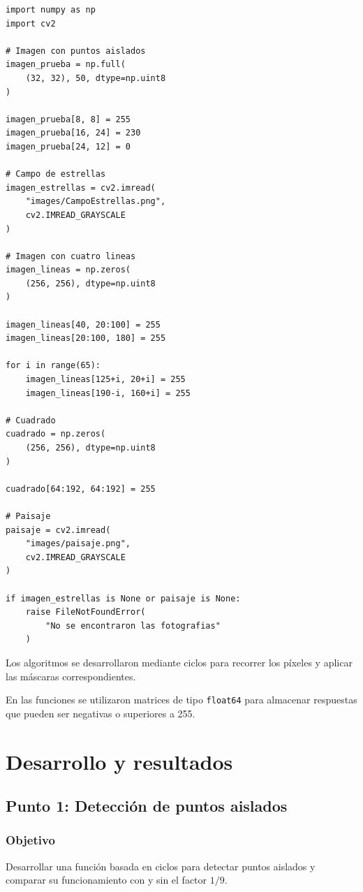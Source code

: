 \documentclass[11pt,letterpaper]{article}
\begin{document}
\begin{lstlisting}
import numpy as np
import cv2

# Imagen con puntos aislados
imagen_prueba = np.full(
    (32, 32), 50, dtype=np.uint8
)

imagen_prueba[8, 8] = 255
imagen_prueba[16, 24] = 230
imagen_prueba[24, 12] = 0

# Campo de estrellas
imagen_estrellas = cv2.imread(
    "images/CampoEstrellas.png",
    cv2.IMREAD_GRAYSCALE
)

# Imagen con cuatro lineas
imagen_lineas = np.zeros(
    (256, 256), dtype=np.uint8
)

imagen_lineas[40, 20:100] = 255
imagen_lineas[20:100, 180] = 255

for i in range(65):
    imagen_lineas[125+i, 20+i] = 255
    imagen_lineas[190-i, 160+i] = 255

# Cuadrado
cuadrado = np.zeros(
    (256, 256), dtype=np.uint8
)

cuadrado[64:192, 64:192] = 255

# Paisaje
paisaje = cv2.imread(
    "images/paisaje.png",
    cv2.IMREAD_GRAYSCALE
)

if imagen_estrellas is None or paisaje is None:
    raise FileNotFoundError(
        "No se encontraron las fotografias"
    )
\end{lstlisting}

Los algoritmos se desarrollaron mediante
ciclos para recorrer los píxeles y aplicar
las máscaras correspondientes.

En las funciones se utilizaron matrices
de tipo \texttt{float64} para almacenar
respuestas que pueden ser negativas
o superiores a 255.

\section{Desarrollo y resultados}

\subsection{Punto 1: Detección de puntos aislados}

\subsubsection*{Objetivo}

Desarrollar una función basada en ciclos
para detectar puntos aislados y comparar
su funcionamiento con y sin el factor $1/9$.
\end{document}
